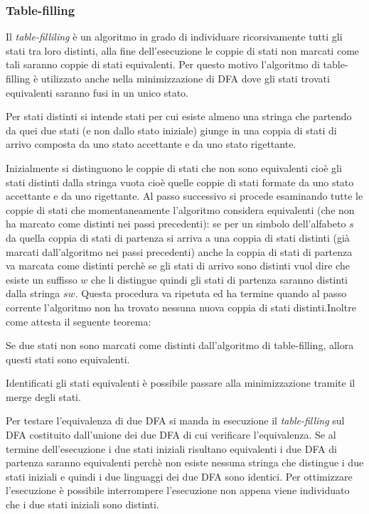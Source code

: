 \subsubsection{Table-filling}Il \textit{table-filliling} \cite{Nor09} è un algoritmo in grado di individuare ricorsivamente tutti gli stati tra loro distinti, alla fine dell'esecuzione le coppie di stati non marcati come tali saranno coppie di stati equivalenti. Per questo motivo l'algoritmo di table-filling è utilizzato anche nella minimizzazione di DFA dove gli stati trovati equivalenti saranno fusi in un unico stato.

Per stati distinti si intende stati per cui esiste almeno una stringa che partendo da quei due stati (e non dallo stato iniziale) giunge in una coppia di stati di arrivo composta da uno stato accettante e da uno stato rigettante.

Inizialmente si distinguono le coppie di stati che non sono equivalenti cioè gli stati distinti dalla stringa vuota cioè quelle coppie di stati formate da uno stato accettante e da uno rigettante. Al passo successivo si procede esaminando tutte le coppie di stati che momentaneamente l'algoritmo considera equivalenti (che non ha marcato come distinti nei passi precedenti): se per un simbolo dell'alfabeto $s$ da quella coppia di stati di partenza si arriva a una coppia di stati distinti (già marcati dall'algoritmo nei passi precedenti) anche la coppia di stati di partenza va marcata come distinti perchè se gli stati di arrivo sono distinti vuol dire che esiste un suffisso $w$ che li distingue quindi gli stati di partenza saranno distinti dalla stringa $sw$. Questa procedura va ripetuta ed ha termine quando al passo corrente l'algoritmo non ha trovato nessuna nuova coppia di stati distinti.Inoltre come attesta il seguente teorema:
\begin{teorema*}
Se due stati non sono marcati come distinti dall'algoritmo di table-filling, allora questi stati sono equivalenti. \cite{Hop07}
\end{teorema*}
Identificati gli stati equivalenti è possibile passare alla minimizzazione tramite il merge degli stati.

Per testare l'equivalenza di due DFA si manda in esecuzione il \textit{table-filling} sul DFA costituito dall'unione dei due DFA di cui verificare l'equivalenza. Se al termine dell'esecuzione i due stati iniziali risultano equivalenti i due DFA di partenza saranno equivalenti perchè non esiste nessuna stringa che distingue i due stati iniziali e quindi i due linguaggi dei due DFA sono identici. Per ottimizzare l'esecuzione è possibile interrompere l'esecuzione non appena viene individuato che i due stati iniziali sono distinti.


